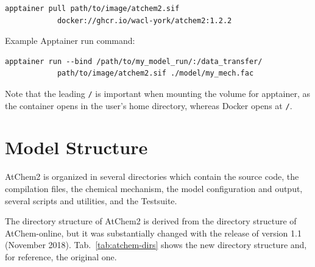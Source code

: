 \begin{Verbatim}[fontsize=\small]
  apptainer pull path/to/image/atchem2.sif
            docker://ghcr.io/wacl-york/atchem2:1.2.2
\end{Verbatim}

Example Apptainer run command:

\begin{Verbatim}[fontsize=\small]
  apptainer run --bind /path/to/my_model_run/:/data_transfer/
            path/to/image/atchem2.sif ./model/my_mech.fac
\end{Verbatim}

Note that the leading \texttt{/} is important when mounting the volume for apptainer, as the
container opens in the user's home directory, whereas Docker opens at \texttt{/}.

\section{Model Structure} \label{sec:model-structure}

AtChem2 is organized in several directories which contain the source code, the compilation
files, the chemical mechanism, the model configuration and output, several scripts and
utilities, and the Testsuite.

The directory structure of AtChem2 is derived from the directory structure of AtChem-online,
but it was substantially changed with the release of version 1.1 (November 2018).
Tab.~\ref{tab:atchem-dirs} shows the new directory structure and, for reference, the original
one.

